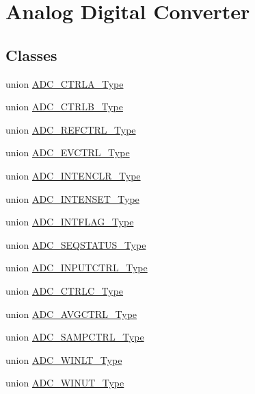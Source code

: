 \hypertarget{group___s_a_m_l21___a_d_c}{}\section{Analog Digital Converter}
\label{group___s_a_m_l21___a_d_c}
\subsection*{Classes}
\begin{DoxyCompactItemize}
\item 
union \hyperlink{union_a_d_c___c_t_r_l_a___type}{A\+D\+C\+\_\+\+C\+T\+R\+L\+A\+\_\+\+Type}
\item 
union \hyperlink{union_a_d_c___c_t_r_l_b___type}{A\+D\+C\+\_\+\+C\+T\+R\+L\+B\+\_\+\+Type}
\item 
union \hyperlink{union_a_d_c___r_e_f_c_t_r_l___type}{A\+D\+C\+\_\+\+R\+E\+F\+C\+T\+R\+L\+\_\+\+Type}
\item 
union \hyperlink{union_a_d_c___e_v_c_t_r_l___type}{A\+D\+C\+\_\+\+E\+V\+C\+T\+R\+L\+\_\+\+Type}
\item 
union \hyperlink{union_a_d_c___i_n_t_e_n_c_l_r___type}{A\+D\+C\+\_\+\+I\+N\+T\+E\+N\+C\+L\+R\+\_\+\+Type}
\item 
union \hyperlink{union_a_d_c___i_n_t_e_n_s_e_t___type}{A\+D\+C\+\_\+\+I\+N\+T\+E\+N\+S\+E\+T\+\_\+\+Type}
\item 
union \hyperlink{union_a_d_c___i_n_t_f_l_a_g___type}{A\+D\+C\+\_\+\+I\+N\+T\+F\+L\+A\+G\+\_\+\+Type}
\item 
union \hyperlink{union_a_d_c___s_e_q_s_t_a_t_u_s___type}{A\+D\+C\+\_\+\+S\+E\+Q\+S\+T\+A\+T\+U\+S\+\_\+\+Type}
\item 
union \hyperlink{union_a_d_c___i_n_p_u_t_c_t_r_l___type}{A\+D\+C\+\_\+\+I\+N\+P\+U\+T\+C\+T\+R\+L\+\_\+\+Type}
\item 
union \hyperlink{union_a_d_c___c_t_r_l_c___type}{A\+D\+C\+\_\+\+C\+T\+R\+L\+C\+\_\+\+Type}
\item 
union \hyperlink{union_a_d_c___a_v_g_c_t_r_l___type}{A\+D\+C\+\_\+\+A\+V\+G\+C\+T\+R\+L\+\_\+\+Type}
\item 
union \hyperlink{union_a_d_c___s_a_m_p_c_t_r_l___type}{A\+D\+C\+\_\+\+S\+A\+M\+P\+C\+T\+R\+L\+\_\+\+Type}
\item 
union \hyperlink{union_a_d_c___w_i_n_l_t___type}{A\+D\+C\+\_\+\+W\+I\+N\+L\+T\+\_\+\+Type}
\item 
union \hyperlink{union_a_d_c___w_i_n_u_t___type}{A\+D\+C\+\_\+\+W\+I\+N\+U\+T\+\_\+\+Type}

\end{DoxyCompactItemize}
